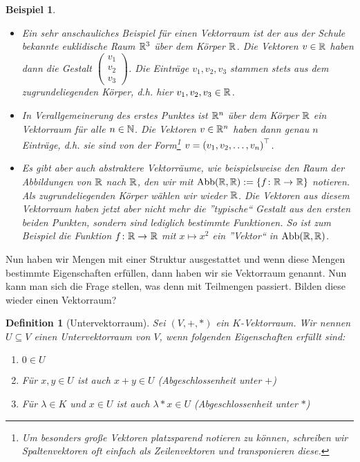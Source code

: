 \documentclass[ngerman, a4paper, 12pt]{article}
\newcounter{themcount}
\theoremstyle{plain}
\newtheorem{definition}[themcount]{Definition}
\newtheorem{beispiel}[themcount]{Beispiel}
\theoremstyle{nonumberplain}
\begin{document}
	\begin{beispiel}
		\begin{itemize}
			\item Ein sehr anschauliches Beispiel für einen Vektorraum ist der aus der Schule bekannte euklidische Raum $\mathbb{R}^3$ über dem Körper $\mathbb{R}$. Die Vektoren $v \in \mathbb{R}$ haben dann die Gestalt $\left( \begin{smallmatrix} v_1 \\ v_2 \\ v_3 \end{smallmatrix} \right)$. Die Einträge $v_1, v_2, v_3$ stammen stets aus dem zugrundeliegenden Körper, d.h. hier $v_1, v_2, v_3 \in \mathbb{R}$.
			\item In Verallgemeinerung des erstes Punktes ist $\mathbb{R}^n$ über dem Körper $\mathbb{R}$ ein Vektorraum für alle $n \in \mathbb{N}$. Die Vektoren $v \in \mathbb{R}^n$ haben dann genau $n$ Einträge, d.h. sie sind von der Form\footnote{Um besonders große Vektoren platzsparend notieren zu können, schreiben wir Spaltenvektoren oft einfach als Zeilenvektoren und transponieren diese.} $v = \left( v_1, v_2, \dots, v_n \right)^{\top}$.
			\item Es gibt aber auch abstraktere Vektorräume, wie beispielsweise den Raum der Abbildungen von $\mathbb{R}$ nach $\mathbb{R}$, den wir mit $\Abb(\R,\R) \defeq \menge{\abb{f}{\R}{\R}}$ notieren. Als zugrundeliegenden Körper wählen wir wieder $\mathbb{R}$. Die Vektoren aus diesem Vektorraum haben jetzt aber nicht mehr die ''typische`` Gestalt aus den ersten beiden Punkten, sondern sind lediglich bestimmte Funktionen. So ist zum Beispiel die Funktion $\abb{f}{\R}{\R}$ mit $x \mapsto x^2$ ein ''Vektor`` in $\operatorname{Abb}(\mathbb{R},\mathbb{R})$.
		\end{itemize}
	\end{beispiel}

	Nun haben wir Mengen mit einer Struktur ausgestattet und wenn diese Mengen bestimmte Eigenschaften erfüllen, dann haben wir sie Vektorraum genannt. Nun kann man sich die Frage stellen, was denn mit Teilmengen passiert. Bilden diese wieder einen Vektorraum?
	
	\begin{definition}[Untervektorraum]
		Sei $(V,+,*)$ ein $K$-Vektorraum. Wir nennen $U \subseteq V$ einen Untervektorraum von $V$, wenn folgenden Eigenschaften erfüllt sind:
		\begin{enumerate}[label=(UV\arabic*), leftmargin=*]
			\item $0 \in U$
			\item Für $x,y \in U$ ist auch $x+y \in U$ (Abgeschlossenheit unter $+$)
			\item Für $\lambda \in K$ und $x \in U$ ist auch $\lambda * x \in U$ (Abgeschlossenheit unter $*$)
		\end{enumerate}
	\end{definition}
\end{document}

